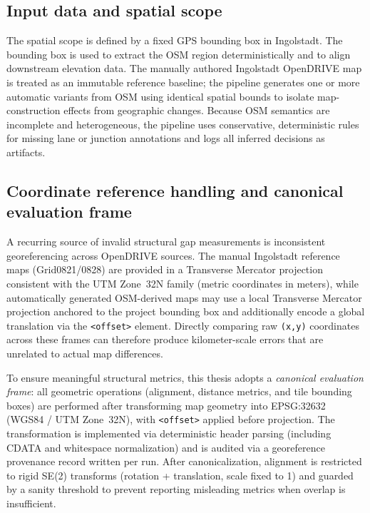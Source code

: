 \subsection{Input data and spatial scope}
The spatial scope is defined by a fixed GPS bounding box in Ingolstadt. The bounding box is used to extract the OSM region deterministically and to align downstream elevation data. The manually authored Ingolstadt OpenDRIVE map is treated as an immutable reference baseline; the pipeline generates one or more automatic variants from OSM using identical spatial bounds to isolate map-construction effects from geographic changes. Because OSM semantics are incomplete and heterogeneous, the pipeline uses conservative, deterministic rules for missing lane or junction annotations and logs all inferred decisions as artifacts.



\subsection{Coordinate reference handling and canonical evaluation frame}
\label{sec:crs_handling}
A recurring source of invalid structural gap measurements is inconsistent georeferencing across OpenDRIVE sources.
The manual Ingolstadt reference maps (Grid0821/0828) are provided in a Transverse Mercator projection consistent with the UTM Zone~32N family (metric coordinates in meters), while automatically generated OSM-derived maps may use a local Transverse Mercator projection anchored to the project bounding box and additionally encode a global translation via the \texttt{<offset>} element.
Directly comparing raw \texttt{(x,y)} coordinates across these frames can therefore produce kilometer-scale errors that are unrelated to actual map differences.

To ensure meaningful structural metrics, this thesis adopts a \emph{canonical evaluation frame}:
all geometric operations (alignment, distance metrics, and tile bounding boxes) are performed after transforming map geometry into EPSG:32632 (WGS84 / UTM Zone~32N), with \texttt{<offset>} applied before projection.
The transformation is implemented via deterministic header parsing (including CDATA and whitespace normalization) and is audited via a georeference provenance record written per run.
After canonicalization, alignment is restricted to rigid SE(2) transforms (rotation + translation, scale fixed to 1) and guarded by a sanity threshold to prevent reporting misleading metrics when overlap is insufficient.

